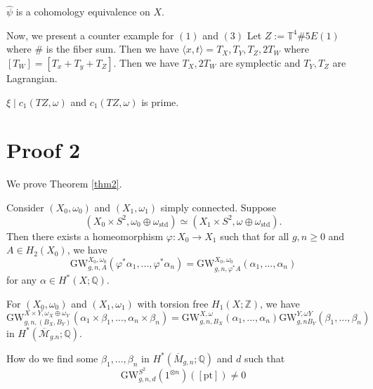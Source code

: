\begin{proposition}

$\hat{\psi}$ is a cohomology equivalence on $X$.

\end{proposition}

Now, we present a counter example for $(1)$ and $(3)$
Let $Z:= \mathbb{T}^4\# 5E(1)$ where $\#$ is the fiber sum. Then we have $\langle x,t \rangle = T_X, T_Y, T_Z, 2T_W$ where $[T_W] = [T_x+T_y+T_Z]$. Then we have $T_X, 2T_W$ are symplectic and $T_Y, T_Z$ are Lagrangian.

\begin{theorem}
[Smith]

$\xi \mid c_1(TZ, \omega)$ and $c_1(TZ, \omega)$ is prime.

\end{theorem}

\section{Proof 2}

We prove Theorem \ref{thm2}.

Consider $(X_0, \omega_0)$ and $(X_1, \omega_1)$ simply connected. Suppose
\[
(X_0\times S^2, \omega_0 \oplus \omega_{\text{std}})\simeq (X_1\times S^2, \omega \oplus \omega_{\text{std}}).
\]
Then there exists a homeomorphism $\varphi: X_0\to X_1$ such that for all $g,n \ge 0$ and $A\in H_2(X_0)$, we have
\[
\text{GW}_{g,n,A}^{X_0, \omega_0}(\varphi^* \alpha_1, ..., \varphi^* \alpha_n)= \text{GW}_{g,n,\varphi^* A}^{X_0, \omega_0}(\alpha_1, ..., \alpha_n)
\]
for any $\alpha \in H^*(X; \mathbb{Q})$.

\begin{theorem}

For $(X_0, \omega_0)$ and $(X_1, \omega_1)$ with torsion free $H_1(X; \mathbb{Z})$, we have
\[
\text{GW}_{g,n,(B_X, B_Y)}^{X\times Y, \omega_X \oplus \omega_Y}(\alpha_1\times \beta_1,...,\alpha_n \times \beta_n) = \text{GW}_{g,n,B_X}^{X, \omega}(\alpha_1,...,\alpha_n)\text{GW}_{g,n B_Y}^{Y, \omega Y}(\beta_1,...,\beta_n)
\]
in $H^*(\overline{\mathcal{M}}_{g.n}; \mathbb{Q})$.

\end{theorem}

\begin{problem}
    How do we find some $\beta_1,...,\beta_n$ in $H^*\left(\overline{M}_{g,n}; \mathbb{Q}\right)$ and $d$ such that 
\[ \text{GW}^{S^2}_{g,n,d}\left(1^{\otimes n}\right)\left([\text{pt}]\right) \neq 0\]
\end{problem}

